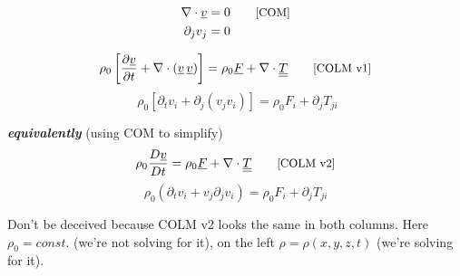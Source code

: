 \documentclass[12pt,landscape]{article}
\begin{document}
\hfill
\begin{minipage}[t]{0.45\textwidth}
\section*{\centering{}}

\begin{align}
    \nabla\cdot \underline{v} &= 0 \tag*{\text{\small[COM]}}\\
    \partial_j v_j &= 0 \nonumber
\end{align}

\noindent\makebox[\linewidth]{\rule{\textwidth}{1pt}}

\begin{equation}
    \rho_0\left[\frac{\partial \underline{v}}{\partial t} + \nabla\cdot(\underline{v} \,\underline{v})\right] = \rho_0\underline{F} + \nabla\cdot\underline{\underline{T}}
    \tag*{\text{\small[COLM v1]}}
\end{equation}
\begin{equation*}
    \; \rho_0 \left[\partial_t v_i + \partial_j(v_j v_i)\right] = \rho_0 F_i + \partial_j T_{ji}
\end{equation*}

\textbf{\emph{equivalently}} (using COM to simplify)
\begin{equation}
    \rho_0\frac{D \underline{v}}{D t} = \rho_0\underline{F} + \nabla\cdot\underline{\underline{T}}
    \tag*{\text{\small[COLM v2]}}
\end{equation}
\begin{equation*}
    \rho_0 \left(\partial_t v_i + v_j\partial_j v_i\right) = \rho_0 F_i + \partial_j T_{ji}
\end{equation*}

\noindent\makebox[\linewidth]{\rule{\textwidth}{1pt}}

Don't be deceived because COLM v2 looks the same in both columns. Here $\rho_0=const.$ (we're not solving for it), on the left $\rho = \rho(x,y,z,t)$ (we're solving for it).

\end{minipage}


\clearpage

\thispagestyle{fancy}
\end{document}
